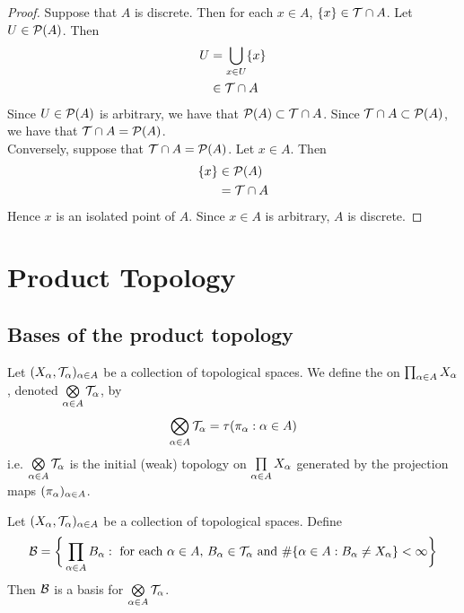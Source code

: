 \documentclass{book}
\begin{document}
\begin{proof}
	Suppose that $A$ is discrete. Then for each $x \in A$, $\{x\} \in \mathcal{T} \cap A$. Let $U \in \mathcal{P}(A)$. Then 
	\begin{align*}
		U
		& = \bigcup_{x \in U} \{x\} \\
		& \in \mathcal{T} \cap A
	\end{align*}
	Since $U \in \mathcal{P}(A)$ is arbitrary, we have that $\mathcal{P}(A) \subset \mathcal{T} \cap A$. Since $\mathcal{T} \cap A \subset \mathcal{P}(A)$, we have that $\mathcal{T} \cap A = \mathcal{P}(A)$. \\
	Conversely, suppose that $\mathcal{T} \cap A = \mathcal{P}(A)$. Let $x \in A$. Then
	\begin{align*}
		\{x\}
		& \in \mathcal{P}(A) \\
		& = \mathcal{T} \cap A
	\end{align*}	
	Hence $x$ is an isolated point of $A$. Since $x \in A$ is arbitrary, $A$ is discrete.
\end{proof}











	
	
	
	
	
	
	
	
	
	
	
	
	
	\newpage
	\section{Product Topology}
	
	\subsection{Bases of the product topology}
	
	\begin{defn} 
	Let $(X_{\alpha}, \mathcal{T}_{\alpha})_{\alpha \in A}$ be a collection of topological spaces. We define the  on $\prod_{\alpha \in A}X_{\alpha}$, denoted $\bigotimes\limits_{\alpha \in A} \mathcal{T}_{\alpha}$, by 
	$$\bigotimes\limits_{\alpha \in A} \mathcal{T}_{\alpha} = \tau(\pi_{\alpha}: {\alpha \in A})$$
	i.e. $\bigotimes\limits_{\alpha \in A} \mathcal{T}_{\alpha} $ is the initial (weak) topology on $\prod\limits_{\alpha \in A} X_{\alpha}$ generated by the projection maps $(\pi_{\alpha})_{\alpha \in A}$.
	\end{defn}

	\begin{ex} 
		Let $(X_{\alpha}, \mathcal{T}_{\alpha})_{\alpha \in A}$ be a collection of topological spaces. Define 
		$$\mathcal{B} = \bigg \{\prod_{\alpha \in A}B_{\alpha}: \text{ for each $\alpha \in A$,  $B_{\alpha} \in \mathcal{T}_{\alpha}$ and $\# \{\alpha \in A: B_{\alpha} \neq X_{\alpha}\} < \infty$} \bigg\}$$
		Then $\mathcal{B}$ is a basis for $\bigotimes\limits_{\alpha \in A} \mathcal{T}_{\alpha}$.
	\end{ex}
\end{document}
